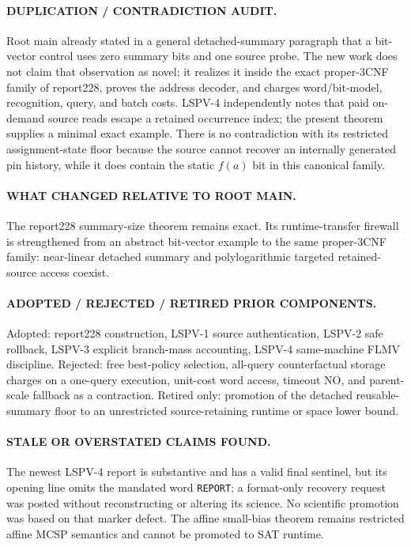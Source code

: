 \documentclass[11pt]{article}
\begin{document}
\paragraph{DUPLICATION / CONTRADICTION AUDIT.}
Root main already stated in a general detached-summary paragraph that a
bit-vector control uses zero summary bits and one source probe.  The new work
does not claim that observation as novel; it realizes it inside the exact
proper-3CNF family of report228, proves the address decoder, and charges
word/bit-model, recognition, query, and batch costs.  LSPV-4 independently
notes that paid on-demand source reads escape a retained occurrence index; the
present theorem supplies a minimal exact example.  There is no contradiction
with its restricted assignment-state floor because the source cannot recover
an internally generated pin history, while it does contain the static $f(a)$
bit in this canonical family.

\paragraph{WHAT CHANGED RELATIVE TO ROOT MAIN.}
The report228 summary-size theorem remains exact.  Its runtime-transfer
firewall is strengthened from an abstract bit-vector example to the same
proper-3CNF family: near-linear detached summary and polylogarithmic targeted
retained-source access coexist.

\paragraph{ADOPTED / REJECTED / RETIRED PRIOR COMPONENTS.}
Adopted: report228 construction, LSPV-1 source authentication, LSPV-2 safe
rollback, LSPV-3 explicit branch-mass accounting, LSPV-4 same-machine FLMV
discipline.  Rejected: free best-policy selection, all-query counterfactual
storage charges on a one-query execution, unit-cost word access, timeout NO,
and parent-scale fallback as a contraction.  Retired only: promotion of the
detached reusable-summary floor to an unrestricted source-retaining runtime or
space lower bound.

\paragraph{STALE OR OVERSTATED CLAIMS FOUND.}
The newest LSPV-4 report is substantive and has a valid final sentinel, but its
opening line omits the mandated word \texttt{REPORT}; a format-only recovery
request was posted without reconstructing or altering its science.  No
scientific promotion was based on that marker defect.  The affine small-bias
theorem remains restricted affine MCSP semantics and cannot be promoted to SAT
runtime.
\end{document}
